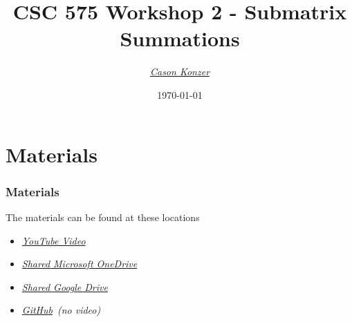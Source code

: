 \documentclass{beamer}
\title[Workshop 1]{CSC 575 Workshop 2 - Submatrix Summations}
\author{\XV\textit{\large{\href{https://github.com/casonk}{Cason Konzer}}}\XB}
\institute[UM FLINT]{\normalsize{\textit{\href{mailto:casonk@umich.edu}{casonk@umich.edu}}}}
\date[]{\today}
\newcommand{\XB}{\color{black}}
\newcommand{\XV}{\color{violet}}
\begin{document}
\begin{frame}
    \titlepage
\end{frame}




\section{Materials}

\begin{frame}

    \frametitle{Materials}

    The materials can be found at these locations

    \vspace{2.5mm}
    \begin{itemize}
        \item \XV\textit{\large{\href{https://youtu.be/YxmtxU44CrM}{YouTube Video}}}\XB
        \item \XV\textit{\large{\href{https://umich-my.sharepoint.com/:f:/g/personal/casonk_umich_edu/Eluov0GBscpHpKC6SwS1vQcBpai93NMa307rb038YKU0uA?e=bbhSqh}{Shared Microsoft OneDrive}}}\XB
        \item \XV\textit{\large{\href{https://drive.google.com/drive/folders/1dVEr45BidZYurfp4pKB_3_CDkN-xm0qa?usp=sharing}{Shared Google Drive}}}\XB
        \item \XV\textit{\large{\href{https://github.com/casonk/CSC575-Algorithm_and_Complexity_Analysis/tree/main/WorkShop/WorkShop2}{GitHub}}}\XB \ \emph{(no video)}
    \end{itemize}

\end{frame}
\end{document}
